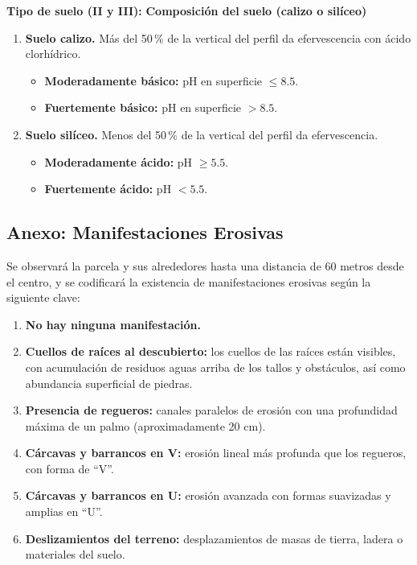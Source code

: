     
\vspace{1em}
\noindent
\textbf{Tipo de suelo (II y III):} \textbf{Composición del suelo (calizo o silíceo)}

\begin{enumerate}
    \item \textbf{Suelo calizo.} Más del 50\,\% de la vertical del perfil da efervescencia con ácido clorhídrico.
    
    \begin{itemize}
        \item \textbf{Moderadamente básico:} pH en superficie $\leq 8.5$.
        \item \textbf{Fuertemente básico:} pH en superficie $> 8.5$.
    \end{itemize}
    
    \item \textbf{Suelo silíceo.} Menos del 50\,\% de la vertical del perfil da efervescencia.
    
    \begin{itemize}
        \item \textbf{Moderadamente ácido:} pH $\geq 5.5$.
        \item \textbf{Fuertemente ácido:} pH $< 5.5$.
    \end{itemize}
\end{enumerate}

\subsection{Anexo: Manifestaciones Erosivas}\label{sec:ManERo}

Se observará la parcela y sus alrededores hasta una distancia de 60 metros desde el centro, y se codificará la existencia de manifestaciones erosivas según la siguiente clave:

\begin{enumerate}
    \item \textbf{No hay ninguna manifestación.}
    
    \item \textbf{Cuellos de raíces al descubierto:} los cuellos de las raíces están visibles, con acumulación de residuos aguas arriba de los tallos y obstáculos, así como abundancia superficial de piedras.
    
    \item \textbf{Presencia de regueros:} canales paralelos de erosión con una profundidad máxima de un palmo (aproximadamente 20 cm).
    
    \item \textbf{Cárcavas y barrancos en V:} erosión lineal más profunda que los regueros, con forma de ``V''.
    
    \item \textbf{Cárcavas y barrancos en U:} erosión avanzada con formas suavizadas y amplias en ``U''.
    
    \item \textbf{Deslizamientos del terreno:} desplazamientos de masas de tierra, ladera o materiales del suelo.
\end{enumerate}

